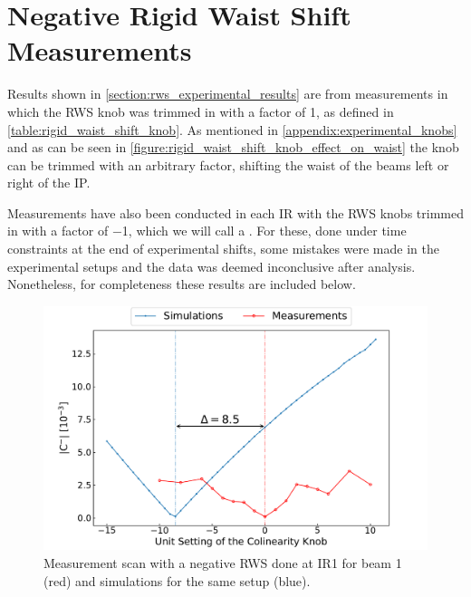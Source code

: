 \chapter{Negative Rigid Waist Shift Measurements}
\label{appendix:inconclusive_measurements}

Results shown in \cref{section:rws_experimental_results} are from measurements in which the \gls{RWS} \gls{knob} was trimmed in with a factor of \num{1}, as defined in \cref{table:rigid_waist_shift_knob}.
As mentioned in \cref{appendix:experimental_knobs} and as can be seen in \cref{figure:rigid_waist_shift_knob_effect_on_waist} the knob can be trimmed with an arbitrary factor, shifting the waist of the beams left or right of the \gls{IP}. 

Measurements have also been conducted in each \gls{IR} with the \gls{RWS} knobs trimmed in with a factor of \num{-1}, which we will call a .
For these, done under time constraints at the end of experimental shifts, some mistakes were made in the experimental setups and the data was deemed inconclusive after analysis.
Nonetheless, for completeness these results are included below.

\begin{figure}[!htb]
    \centering
    \includegraphics*[width=\textwidth]{Figures/Appendices/rws_measurement_ir1_b1_neg.pdf}
    \caption{Measurement scan with a negative RWS done at IR\num{1} for beam \num{1} (\textcolor{mplr}{red}) and simulations for the same setup (\textcolor{mplblue}{blue}).}
    \label{figure:ir1_b1_neg_measurement}
\end{figure}

